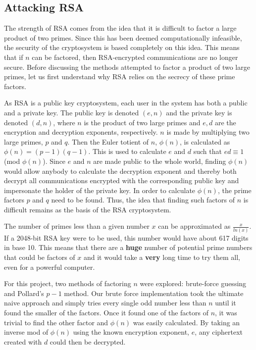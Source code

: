 \documentclass[12pt]{report}
\begin{document}
\subsection{Attacking RSA}
The strength of RSA comes from the idea that it is difficult to factor a large product of two primes. Since this has been deemed computationally infeasible, the
security of the cryptosystem is based completely on this idea. This means that if $n$ can be factored, then RSA-encrypted communications are no longer secure.
Before discussing the methods attempted to factor a product of two large primes, let us first understand why RSA relies on the secrecy of these prime factors.

As RSA is a public key cryptosystem, each user in the system has both a public and a private key. The public key is denoted $(e,n)$ and the private key is denoted
$(d,n)$, where $n$ is the product of two large primes and $e,d$ are the encryption and decryption exponents, respectively. $n$ is made by multiplying two large
primes, $p$ and $q$. Then the Euler totient of $n$, $\phi(n)$, is calculated as $\phi(n) = (p-1)(q-1)$. This is used to calculate $e$ and $d$ such that
$ed \equiv 1$ (mod $\phi(n)$). Since $e$ and $n$ are made public to the whole world, finding $\phi(n)$ would allow anybody to calculate the decryption exponent and
thereby both decrypt all communications encrypted with the corresponding public key and impersonate the holder of the private key. In order to calculate $\phi(n)$,
the prime factors $p$ and $q$ need to be found. Thus, the idea that finding such factors of $n$ is difficult remains as the basis of the RSA cryptosystem.

The number of primes less than a given number $x$ can be approximated as $\frac{x}{ln(x)}$. If a 2048-bit RSA key were to be used, this number would have about 617
digits in base 10. This means that there are a \textbf{huge} number of potential prime numbers that could be factors of $x$ and it would take a \textbf{very} long
time to try them all, even for a powerful computer.

For this project, two methods of factoring $n$ were explored: brute-force guessing and Pollard's $p-1$ method.\cite{pollard} Our brute force implementation took the
ultimate naive approach and simply tries every single odd number less than $n$ until it found the smaller of the factors. Once it found one of the factors of $n$,
it was trivial to find the other factor and $\phi(n)$ was easily calculated. By taking an inverse mod of $\phi(n)$ using the known encryption exponent, $e$, any
ciphertext created with $d$ could then be decrypted.
\end{document}
